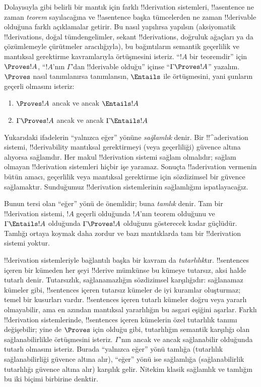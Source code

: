 Dolayısıyla  gibi
belirli bir mantık için farklı
!!{derivation} sistemleri, !!a{sentence} ne zaman \emph{teorem} sayılacağına
ve !!a{sentence} başka tümcelerden ne zaman !!{derivable} olduğuna farklı
açıklamalar getirir. Bu nasıl yapılırsa yapılsın (aksiyomatik !!{derivation}s,
doğal tümdengelimler, sekant !!{derivation}s, doğruluk ağaçları ya da
çözümlemeyle çürütmeler aracılığıyla), bu bağıntıların semantik geçerlilik ve
mantıksal gerektirme kavramlarıyla örtüşmesini isteriz. “$!A$ bir teoremdir”
için $\Proves !A$, “$!A$'nın $\Gamma$'dan !!{derivable} olduğu” içinse
“$\Gamma \Proves !A$” yazalım. $\Proves$ nasıl tanımlanırsa tanımlansın,
$\Entails$ ile örtüşmesini, yani şunların geçerli olmasını isteriz:
\begin{enumerate}
\item $\Proves !A$ ancak ve ancak $\Entails !A$
\item $\Gamma \Proves !A$ ancak ve ancak $\Gamma \Entails !A$
\end{enumerate}
Yukarıdaki ifadelerin “yalnızca eğer” yönüne \emph{sağlamlık} denir.
Bir !!^a{derivation} sistemi, !!{derivability} mantıksal gerektirmeyi (veya
geçerliliği) güvence altına alıyorsa sağlamdır. Her makul !!{derivation}
sistemi sağlam olmalıdır; sağlam olmayan !!{derivation} sistemleri hiçbir işe
yaramaz. Sonuçta !!a{derivation} vermenin bütün amacı, geçerlilik veya
mantıksal gerektirme için sözdizimsel bir güvence sağlamaktır. Sunduğumuz
!!{derivation} sistemlerinin sağlamlığını ispatlayacağız.

Bunun tersi olan “eğer” yönü de önemlidir; buna \emph{tamlık} denir. Tam bir
!!{derivation} sistemi, $!A$ geçerli olduğunda $!A$'nın teorem olduğunu ve
$\Gamma \Entails !A$ olduğunda $\Gamma \Proves !A$ olduğunu gösterecek kadar
güçlüdür. Tamlığı ortaya koymak daha zordur ve bazı mantıklarda tam bir
!!{derivation} sistemi yoktur.

!!{derivation} sistemleriyle bağlantılı başka bir kavram da
\emph{tutarlılık}tır. !!{sentence}s içeren bir kümeden her şeyi
!!{derive} mümkünse bu kümeye tutarsız, aksi halde tutarlı denir. Tutarsızlık,
sağlanamazlığın sözdizimsel karşılığıdır: sağlanamaz kümeler gibi,
!!{sentence}s içeren tutarsız kümeler de iyi kuramlar oluşturmaz; temel bir
kusurları vardır. !!{sentence}s içeren tutarlı kümeler doğru veya yararlı
olmayabilir, ama en azından mantıksal yararlılığın bu asgari eşiğini aşarlar.
Farklı !!{derivation} sistemlerinde, !!{sentence}s içeren kümelerin özel
tutarlılık tanımı değişebilir; yine de $\Proves$ için olduğu gibi,
tutarlılığın semantik karşılığı olan sağlanabilirlikle örtüşmesini isteriz.
$\Gamma$'nın ancak ve ancak sağlanabilir olduğunda tutarlı olmasını isteriz.
Burada “yalnızca eğer” yönü tamlığa (tutarlılık sağlanabilirliği güvence altına
alır), “eğer” yönü ise sağlamlığa (sağlanabilirlik tutarlılığı güvence altına
alır) karşılık gelir. Nitekim klasik
 sağlamlık ve
tamlığın bu iki biçimi birbirine denktir.

